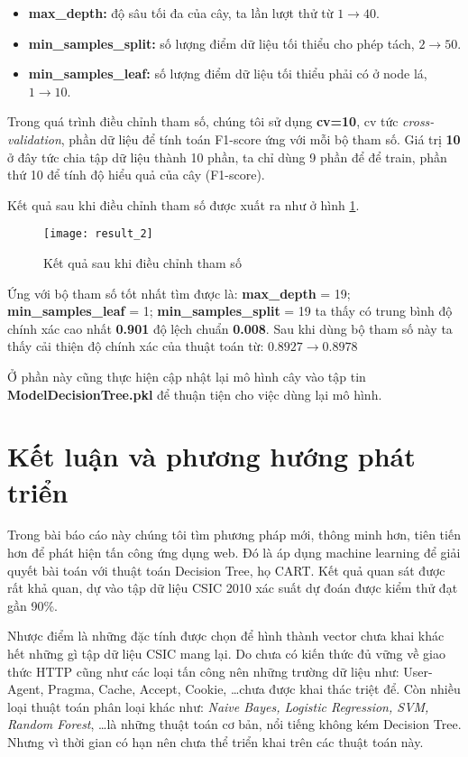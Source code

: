 \documentclass[../main-report.tex]{subfiles}
\begin{document}
\begin{itemize}
\item \textbf{max\_depth:} độ sâu tối đa của cây, ta lần lượt thử từ $1 \to 40$.
\item \textbf{min\_samples\_split:} số lượng điểm dữ liệu tối thiểu cho phép tách, $2 \to 50$.
\item \textbf{min\_samples\_leaf:} số lượng điểm dữ liệu tối thiểu phải có ở node lá, $1 \to 10$.
\end{itemize}

Trong quá trình điều chỉnh tham số, chúng tôi sử dụng \textbf{cv=10}, cv tức \emph{cross-validation}, phần dữ liệu để tính toán F1-score ứng với mỗi bộ tham số. Giá trị \textbf{10} ở đây tức chia tập dữ liệu thành 10 phần, ta chỉ dùng 9 phần để để train, phần thứ 10 để tính độ hiểu quả của cây (F1-score).

Kết quả sau khi điều chỉnh tham số được xuất ra như ở hình \ref{fig:result_2}.

\begin{figure}[ht!]
\centering\texttt{[image: result\_2]}
\caption{Kết quả sau khi điều chỉnh tham số}
\label{fig:result_2}
\end{figure}

Ứng với bộ tham số tốt nhất tìm được là: \textbf{max\_depth} = 19; \textbf{min\_samples\_leaf} = 1; \textbf{min\_samples\_split} = 19  ta thấy có trung bình độ chính xác cao nhất \textbf{0.901} độ lệch chuẩn \textbf{0.008}. Sau khi dùng bộ tham số này ta thấy cải thiện độ chính xác của thuật toán từ: $0.8927 \to 0.8978$

Ở phần này cũng thực hiện cập nhật lại mô hình cây vào tập tin \textbf{ModelDecisionTree.pkl} để thuận tiện cho việc dùng lại mô hình.

\section{Kết luận và phương hướng phát triển}
Trong bài báo cáo này chúng tôi tìm phương pháp mới, thông minh hơn, tiên tiến hơn để phát hiện tấn công ứng dụng web. Đó là áp dụng machine learning để giải quyết bài toán với thuật toán Decision Tree, họ CART. Kết quả quan sát được rất khả quan, dự vào tập dữ liệu CSIC 2010 xác suất dự đoán được kiểm thử đạt gần 90\%.

Nhược điểm là những đặc tính được chọn để hình thành vector chưa khai khác hết những gì tập dữ liệu CSIC mang lại. Do chưa có kiến thức đủ vững về giao thức HTTP cũng như các loại tấn công nên những trường dữ liệu như: User-Agent, Pragma, Cache, Accept, Cookie, \ldots chưa được khai thác triệt để. Còn nhiều loại thuật toán phân loại khác như: \emph{Naive Bayes, Logistic Regression, SVM, Random Forest}, \ldots là những thuật toán cơ bản, nổi tiếng không kém Decision Tree. Nhưng vì thời gian có hạn nên chưa thể triển khai trên các thuật toán này.
\end{document}

